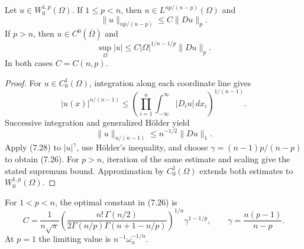 \begin{theorem}
\label{gt:thm-sobolev-embedding-basic}
Let $u\in W_0^{1,p}(\Omega)$. If $1\leq p<n$, then
$u\in L^{np/(n-p)}(\Omega)$ and
\begin{equation}
\tag{7.26}
\|u\|_{np/(n-p)}\leq C\|Du\|_p.
\end{equation}
If $p>n$, then $u\in C^0(\overline\Omega)$ and
\[
\sup_\Omega|u|\leq C|\Omega|^{1/n-1/p}\|Du\|_p.
\]
In both cases $C=C(n,p)$.
\end{theorem}
\begin{proof}
\sketch For $u\in C_0^1(\Omega)$, integration along each coordinate line
gives
\begin{equation}
\tag{7.27}
|u(x)|^{n/(n-1)}
\leq\left(\prod_{i=1}^n\int_{-\infty}^{\infty}|D_i u|\,dx_i
\right)^{1/(n-1)}.
\end{equation}
Successive integration and generalized H\"older yield
\begin{equation}
\tag{7.28}
\|u\|_{n/(n-1)}\leq n^{-1/2}\|Du\|_1.
\end{equation}
Apply (7.28) to $|u|^\gamma$, use H\"older's inequality, and choose
$\gamma=(n-1)p/(n-p)$ to obtain (7.26). For $p>n$, iteration of the same
estimate and scaling give the stated supremum bound. Approximation by
$C_0^1(\Omega)$ extends both estimates to $W_0^{1,p}(\Omega)$.
\end{proof}

\begin{remark}
\label{gt:rem-sobolev-sharp-constant}
For $1<p<n$, the optimal constant in (7.26) is
\[
C=\frac1{n\sqrt\pi}
\left(\frac{n!\,\Gamma(n/2)}{2\Gamma(n/p)\Gamma(n+1-n/p)}\right)^{1/n}
\gamma^{1-1/p},
\qquad \gamma=\frac{n(p-1)}{n-p}.
\]
At $p=1$ the limiting value is $n^{-1}\omega_n^{-1/n}$.
\end{remark}

